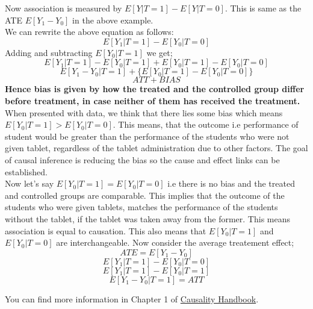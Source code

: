\documentclass{article}
\begin{document}
Now association is measured by $E[Y | T = 1] - E[Y | T = 0]$. This is same as the ATE $E[Y_1 - Y_0]$ in the above example.\\
We can rewrite the above equation as follows:\\
$$E[Y_1 | T = 1] - E[Y_0 | T = 0]$$
Adding and subtracting $E[Y_0 | T = 1]$ we get;\\
$$E[Y_1 | T = 1] - E[Y_0 | T = 1] + E[Y_0 | T = 1] - E[Y_0 | T = 0]$$
$$E[Y_1 - Y_0 | T = 1] + \{E[Y_0 | T = 1] - E[Y_0 | T = 0]\}$$
$$ATT + BIAS$$
\textbf{Hence bias is given by how the treated and the controlled group differ before treatment, in case neither of them has received the treatment.}\\
When presented with data, we think that there lies some bias which means $E[Y_0 | T = 1] > E[Y_0 | T = 0]$. This means, that
the outcome i.e performance of student would be greater than the performance of the students who were not given tablet, regardless of the tablet 
administration due to other factors. The goal of causal inference is reducing the bias so the cause and effect links can be established.\\
Now let's say $E[Y_0 | T = 1] = E[Y_0 | T = 0]$ i.e there is no bias and the treated and controlled groups are comparable.
This implies that the outcome of the students who were given tablets,
matches the performance of the students without the tablet, if the tablet was taken away from the former. This means association is equal to causation.
This also means that $E[Y_0 | T = 1]$ and $E[Y_0 | T = 0]$ are interchangeable. Now consider the average treatement effect;\\
$$ATE = E[Y_1 - Y_0]$$
$$E[Y_1 | T = 1] - E[Y_0 | T = 0]$$
$$E[Y_1 | T = 1] - E[Y_0 | T = 1]$$
$$E[Y_1 - Y_0 | T = 1] = ATT$$

You can find more information in Chapter 1 of \href{https://matheusfacure.github.io/python-causality-handbook/01-Introduction-To-Causality.html}{Causality Handbook}.
\end{document}
